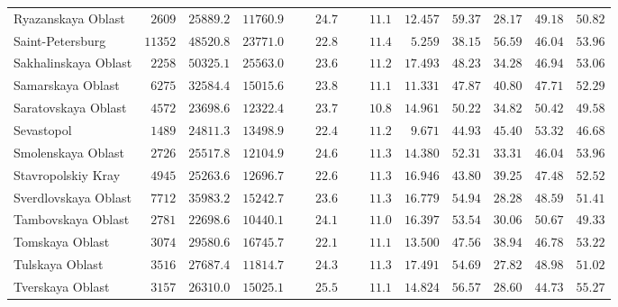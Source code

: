 \documentclass[alpha-refs]{wiley-article-03v}
\begin{document}
{\begin{longtable}{lcccccccccc}
		Ryazanskaya Oblast  & $\phantom{0}2609$ & $25889.2$ & $11760.9$ & $\phantom{000}24.7$ & $\phantom{000}11.1$ & $12.457$ & $59.37$ & $28.17$ & $49.18$ & $50.82$ \\
		Saint-Petersburg  & $11352$ & $48520.8$ & $23771.0$ & $\phantom{000}22.8$ & $\phantom{000}11.4$ & $\phantom{0}5.259$ & $38.15$ & $56.59$ & $46.04$ & $53.96$ \\
		Sakhalinskaya Oblast  & $\phantom{0}2258$ & $50325.1$ & $25563.0$ & $\phantom{000}23.6$ & $\phantom{000}11.2$ & $17.493$ & $48.23$ & $34.28$ & $46.94$ & $53.06$ \\
		Samarskaya Oblast  & $\phantom{0}6275$ & $32584.4$ & $15015.6$ & $\phantom{000}23.8$ & $\phantom{000}11.1$ & $11.331$ & $47.87$ & $40.80$ & $47.71$ & $52.29$ \\
		Saratovskaya Oblast  & $\phantom{0}4572$ & $23698.6$ & $12322.4$ & $\phantom{000}23.7$ & $\phantom{000}10.8$ & $14.961$ & $50.22$ & $34.82$ & $50.42$ & $49.58$ \\
		Sevastopol  & $\phantom{0}1489$ & $24811.3$ & $13498.9$ & $\phantom{000}22.4$ & $\phantom{000}11.2$ & $\phantom{0}9.671$ & $44.93$ & $45.40$ & $53.32$ & $46.68$ \\
		Smolenskaya Oblast  & $\phantom{0}2726$ & $25517.8$ & $12104.9$ & $\phantom{000}24.6$ & $\phantom{000}11.3$ & $14.380$ & $52.31$ & $33.31$ & $46.04$ & $53.96$ \\
		Stavropolskiy Kray  & $\phantom{0}4945$ & $25263.6$ & $12696.7$ & $\phantom{000}22.6$ & $\phantom{000}11.3$ & $16.946$ & $43.80$ & $39.25$ & $47.48$ & $52.52$ \\
		Sverdlovskaya Oblast  & $\phantom{0}7712$ & $35983.2$ & $15242.7$ & $\phantom{000}23.6$ & $\phantom{000}11.3$ & $16.779$ & $54.94$ & $28.28$ & $48.59$ & $51.41$ \\
		Tambovskaya Oblast  & $\phantom{0}2781$ & $22698.6$ & $10440.1$ & $\phantom{000}24.1$ & $\phantom{000}11.0$ & $16.397$ & $53.54$ & $30.06$ & $50.67$ & $49.33$ \\
		Tomskaya Oblast  & $\phantom{0}3074$ & $29580.6$ & $16745.7$ & $\phantom{000}22.1$ & $\phantom{000}11.1$ & $13.500$ & $47.56$ & $38.94$ & $46.78$ & $53.22$ \\
		Tulskaya Oblast  & $\phantom{0}3516$ & $27687.4$ & $11814.7$ & $\phantom{000}24.3$ & $\phantom{000}11.3$ & $17.491$ & $54.69$ & $27.82$ & $48.98$ & $51.02$ \\
		Tverskaya Oblast  & $\phantom{0}3157$ & $26310.0$ & $15025.1$ & $\phantom{000}25.5$ & $\phantom{000}11.1$ & $14.824$ & $56.57$ & $28.60$ & $44.73$ & $55.27$ \\

\end{longtable}}
\end{document}
